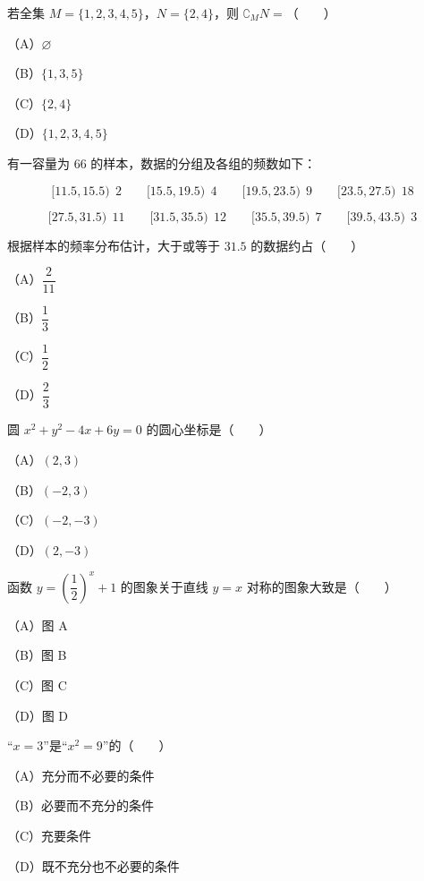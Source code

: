 \begin{question}
若全集 $M=\{1,2,3,4,5\}$，$N=\{2,4\}$，则 $\complement_M N=$\mbox{（　　）}

（A）$\varnothing$

（B）$\{1,3,5\}$

（C）$\{2,4\}$

（D）$\{1,2,3,4,5\}$

\end{question}
\begin{question}
有一容量为 $66$ 的样本，数据的分组及各组的频数如下：

\nopagebreak[4]
\[[11.5,15.5)\ \ 2 \qquad [15.5,19.5)\ \ 4 \qquad [19.5,23.5)\ \ 9 \qquad [23.5,27.5)\ \ 18\]

\nopagebreak[4]
\[[27.5,31.5)\ \ 11 \qquad [31.5,35.5)\ \ 12 \qquad [35.5,39.5)\ \ 7 \qquad [39.5,43.5)\ \ 3\]

根据样本的频率分布估计，大于或等于 $31.5$ 的数据约占\mbox{（　　）}

（A）$\dfrac{2}{11}$

（B）$\dfrac13$

（C）$\dfrac12$

（D）$\dfrac23$

\end{question}
\begin{question}
圆 $x^2+y^2-4x+6y=0$ 的圆心坐标是\mbox{（　　）}

（A）$(2,3)$

（B）$(-2,3)$

（C）$(-2,-3)$

（D）$(2,-3)$

\Needspace{0.4\textheight}
\end{question}
\begin{question}
函数 $y=\left(\dfrac12\right)^x+1$ 的图象关于直线 $y=x$ 对称的图象大致是\mbox{（　　）}

（A）图 A

（B）图 B

（C）图 C

（D）图 D
\nopagebreak[4]
\begin{center}\end{center}
\nopagebreak[4]
\end{question}
\begin{question}
“$x=3$”是“$x^2=9$”的\mbox{（　　）}

（A）充分而不必要的条件

（B）必要而不充分的条件

（C）充要条件

（D）既不充分也不必要的条件

\end{question}
